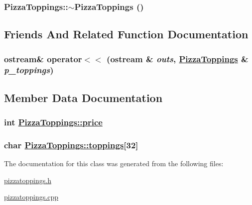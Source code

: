 \hypertarget{class_pizza_toppings_dc812a2e2b80ffa277e3c49d7463bbfd}{
\subsubsection[$\sim$PizzaToppings]{\setlength{\rightskip}{0pt plus 5cm}Pizza\-Toppings::$\sim$Pizza\-Toppings ()}}
\label{class_pizza_toppings_dc812a2e2b80ffa277e3c49d7463bbfd}




\subsection{Friends And Related Function Documentation}
\hypertarget{class_pizza_toppings_d82a6ac0fb2196d7430f04944d9135d4}{
\subsubsection[operator$<$$<$]{\setlength{\rightskip}{0pt plus 5cm}ostream\& operator$<$$<$ (ostream \& {\em outs}, \hyperlink{class_pizza_toppings}{Pizza\-Toppings} \& {\em p\_\-toppings})}}
\label{class_pizza_toppings_d82a6ac0fb2196d7430f04944d9135d4}




\subsection{Member Data Documentation}
\hypertarget{class_pizza_toppings_78a5eb43deef9a7b5b9ce157b9d52ac4}{
\subsubsection[price]{\setlength{\rightskip}{0pt plus 5cm}int \hyperlink{class_pizza_toppings_78a5eb43deef9a7b5b9ce157b9d52ac4}{Pizza\-Toppings::price}}}
\label{class_pizza_toppings_78a5eb43deef9a7b5b9ce157b9d52ac4}


\hypertarget{class_pizza_toppings_d65a29390afb76fef45b1e9225e2b6ed}{
\subsubsection[toppings]{\setlength{\rightskip}{0pt plus 5cm}char \hyperlink{class_pizza_toppings_d65a29390afb76fef45b1e9225e2b6ed}{Pizza\-Toppings::toppings}\mbox{[}32\mbox{]}}}
\label{class_pizza_toppings_d65a29390afb76fef45b1e9225e2b6ed}




The documentation for this class was generated from the following files:\begin{CompactItemize}
\item 
\hyperlink{pizzatoppings_8h}{pizzatoppings.h}\item 
\hyperlink{pizzatoppings_8cpp}{pizzatoppings.cpp}\end{CompactItemize}
